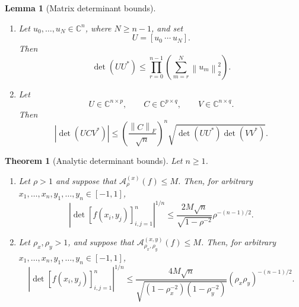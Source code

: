\documentclass[10pt,a4paper]{amsart}
\newtheorem{theorem}{Theorem}
\newtheorem{lemma}{Lemma}
\newcommand{\C}{\mathbb{C}}
\newcommand{\abs}[1]{\left\lvert #1\right\rvert}
\newcommand{\norm}[1]{\left\lVert #1\right\rVert}
\begin{document}
\begin{lemma}[Matrix determinant bounds]
\label{lem:analytic-finite-volume}
\leavevmode
\begin{enumerate}

\item Let \(u_0,\ldots,u_N\in\C^n\), where \(N\ge n-1\), and set
\[
    U=[u_0\ \cdots\ u_N].
\]
Then
\begin{equation}
    \det(UU^*)
    \le
    \prod_{r=0}^{n-1}
    \left(
      \sum_{m=r}^N\norm{u_m}_2^2
    \right).
    \label{eq:analytic-gram-tail}
\end{equation}

\item Let
\[
    U\in\C^{n\times p},
    \qquad
    C\in\C^{p\times q},
    \qquad
    V\in\C^{n\times q}.
\]
Then
\begin{equation}
    \abs{\det(UCV^*)}
    \le
    \left(\frac{\norm{C}_F}{\sqrt n}\right)^n
    \sqrt{\det(UU^*)\det(VV^*)}.
    \label{eq:analytic-finite-factorization}
\end{equation}
\end{enumerate}
\end{lemma}

\begin{theorem}[Analytic determinant bounds]
\label{thm:analytic-determinant}
Let $n\ge1$.
\begin{enumerate}

\item
Let $\rho>1$ and suppose that
$\mathcal A_\rho^{(x)}(f)\le M$. Then, for arbitrary
$x_1,\ldots,x_n,y_1,\ldots,y_n\in [-1, 1]$,
\begin{equation}
    \abs{\det[f(x_i,y_j)]_{i,j=1}^n}^{1/n}
    \le
    \frac{2M\sqrt n}{\sqrt{1-\rho^{-2}}}
    \rho^{-(n-1)/2}.
    \label{eq:analytic-determinant}
\end{equation}

\item
Let $\rho_x,\rho_y>1$, and suppose that
$\mathcal A_{\rho_x,\rho_y}^{(x,y)}(f)\le M$. Then, for arbitrary
$x_1,\ldots,x_n,y_1,\ldots,y_n\in [-1, 1]$,
\begin{equation}
    \abs{\det[f(x_i,y_j)]_{i,j=1}^n}^{1/n}
    \le
    \frac{4M\sqrt n}
         {\sqrt{(1-\rho_x^{-2})(1-\rho_y^{-2})}}
    (\rho_x\rho_y)^{-(n-1)/2}.
    \label{eq:mixed-analytic-determinant}
\end{equation}

\end{enumerate}
\end{theorem}
\end{document}
